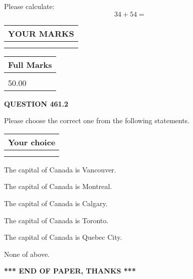 \documentclass[12pt]{article}
\begin{document}
  
 
Please calculate:
\begin{equation}
34 +  %
54 = \nonumber
\end{equation}
 

 

 
  
\vspace{0.2in}
  
\noindent\begin{tabular}{|l|}
\hline
 YOUR MARKS  \\
\hline
 \\ 
 \\ 
\hline
\end{tabular}
\hspace{0.05in} \begin{tabular}{|l|}
\hline
 Full Marks  \\
\hline
 \\ 
50.00 \\
\hline
\end{tabular}
{\textbf{\Large{QUESTION
461.2 
}}}
  
  
Please choose the correct one from the following statements.
  
  
\noindent\hspace{3.0in} \begin{tabular}{|l|}
\hline
Your choice \\
\hline
 \\ 
 \\ 
\hline
\end{tabular}
  
  
 
 
The capital of Canada is Vancouver.
 
 
The capital of Canada is Montreal.
 
 
The capital of Canada is Calgary.
 
 
The capital of Canada is Toronto.
 
 
The capital of Canada is Quebec City.
 
 
 None of above.
 
 
   
   
 \vspace{0.2in}
 
   
   
   
   
\vspace{1.0in} 
{\textbf{\large{ *** END OF PAPER, THANKS *** }}} 
   
\end{document}
